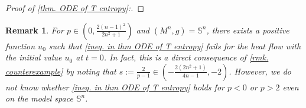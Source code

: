 \documentclass[11pt]{amsart}
\newtheorem{remark}{Remark}
\numberwithin{equation}{section}
\numberwithin{lemma}{section}
\numberwithin{proposition}{section}
\numberwithin{corollary}{section}
\numberwithin{remark}{section}
\newcommand{\dd}{\mathop{}\!\mathrm{d}}%
\begin{document}
\begin{proof}[Proof of \cref{thm. ODE of T entropy}:]
\end{proof}
\begin{remark}\label{rmk. counterexample for ODE}
    For $p\in\left(0,\frac{2(n-1)^2}{2n^2+1}\right)$ and $(M^n,g)=\mathbb{S}^n$, there exists a positive function $u_0$ such that  \cref{ineq. in thm ODE of T entropy} fails for the heat flow with the initial value $u_0$  at $t=0$. In fact, this is a direct consequence of \cref{rmk. counterexample} by noting that $s:=\frac{2}{p-1}\in
        \left(-\frac{2(2n^2+1)}{4n-1},-2\right)$. 
    However, we do not know whether \cref{ineq. in thm ODE of T entropy} holds for $p< 0$ or $p>2$ even on the model space $\mathbb{S}^n$.
\end{remark}
\end{document}

